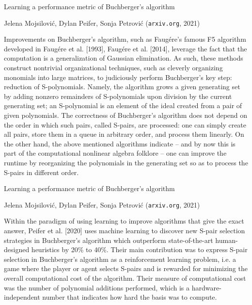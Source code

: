 \documentclass{beamer}
\begin{document}
\begin{frame}

\begin{exampleblock}{Learning a performance metric of Buchberger's algorithm

Jelena Mojsilovi\'c, Dylan Peifer, Sonja Petrovi\'c ({\tt arxiv.org}, 2021)
}
Improvements on Buchberger's algorithm, such as Faug\'ere's famous F5 algorithm developed
in Faug\'ere et al. [1993], Faug\'ere et al. [2014], leverage the fact that the computation is
a generalization of Gaussian elimination. As such, these methods construct nontrivial
organizational techniques, such as cleverly organizing monomials into large matrices, to judiciously
perform Buchberger's key step: reduction of S-polynomials. Namely, the algorithm grows a
given generating set by adding nonzero remainders of S-polynomials upon division by the
current generating set; an S-polynomial is an element of the ideal created from a pair of
given polynomials. The correctness of Buchberger's algorithm does not depend on the order
in which such pairs, called S-pairs, are processed: one can simply create all pairs, store them
in a queue in arbitrary order, and process them linearly. On the other hand, the above
mentioned algorithms indicate – and by now this is part of the computational nonlinear algebra
folklore – one can improve the runtime by reorganizing the polynomials in the generating set
so as to process the S-pairs in different order.
\end{exampleblock}

\end{frame}

\begin{frame}

\begin{exampleblock}{Learning a performance metric of Buchberger's algorithm

Jelena Mojsilovi\'c, Dylan Peifer, Sonja Petrovi\'c ({\tt arxiv.org}, 2021)
}
Within the paradigm of using
learning to improve algorithms that give the exact answer, Peifer et al. [2020] uses machine
learning to discover new S-pair selection strategies in Buchberger's algorithm which outperform
state-of-the-art human-designed heuristics by 20\% to 40\%. Their main contribution was
to express S-pair selection in Buchberger's algorithm as a reinforcement learning problem, i.e.
a game where the player or agent selects S-pairs and is rewarded for minimizing the overall
computational cost of the algorithm. Their measure of computational cost was the number
of polynomial additions performed, which is a hardware- independent number that indicates
how hard the basis was to compute.
\end{exampleblock}

\end{frame}
\end{document}
